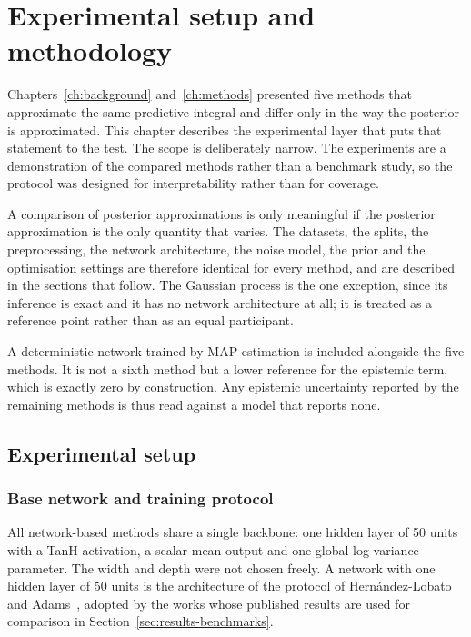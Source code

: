 \chapter{Experimental setup and methodology}
\label{ch:setup}

Chapters~\ref{ch:background} and~\ref{ch:methods} presented five methods that
approximate the same predictive integral and differ only in the way the posterior
is approximated. This chapter describes the experimental layer that puts that
statement to the test. The scope is deliberately narrow. The experiments are a
demonstration of the compared methods rather than a benchmark study, so the
protocol was designed for interpretability rather than for coverage.

A comparison of posterior approximations is only meaningful if the posterior
approximation is the only quantity that varies. The datasets, the splits, the
preprocessing, the network architecture, the noise model, the prior and the
optimisation settings are therefore identical for every method, and are described
in the sections that follow. The Gaussian process is the one exception, since its
inference is exact and it has no network architecture at all; it is treated as a
reference point rather than as an equal participant.

A deterministic network trained by MAP estimation is included alongside the five
methods. It is not a sixth method but a lower reference for the epistemic term,
which is exactly zero by construction. Any epistemic uncertainty reported by the
remaining methods is thus read against a model that reports none.

\section{Experimental setup}
\label{sec:setup-design}

\subsection{Base network and training protocol}
\label{subsec:base-network}

All network-based methods share a single backbone: one hidden layer of 50 units
with a TanH activation, a scalar mean output and one global log-variance parameter.
The width and depth were not chosen freely. A network with one hidden layer of 50
units is the architecture of the protocol of Hernández-Lobato and
Adams~\cite{hernandez-lobato2015}, adopted by the works whose published results are
used for comparison in Section~\ref{sec:results-benchmarks}.

